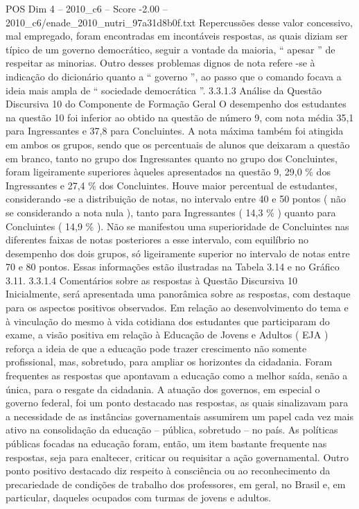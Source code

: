 \begin{textsample}{POS Dim 4 – 2010\_c6 – Score -2.00 – 2010\_c6/enade\_2010\_nutri\_97a31d8b0f.txt}
Repercussões desse valor concessivo, mal empregado, foram encontradas em incontáveis respostas, as quais diziam ser típico de um governo democrático, seguir a vontade da maioria, “ apesar ” de respeitar as minorias.
Outro desses problemas dignos de nota refere -se à indicação do dicionário quanto a “ governo ”, ao passo que o comando focava a ideia mais ampla de “ sociedade democrática ”. 3.3.1.3 Análise da Questão Discursiva 10 do Componente de Formação Geral O desempenho dos estudantes na questão 10 foi inferior ao obtido na questão de número 9, com nota média 35,1 para Ingressantes e 37,8 para Concluintes.
A nota máxima também foi atingida em ambos os grupos, sendo que os percentuais de alunos que deixaram a questão em branco, tanto no grupo dos Ingressantes quanto no grupo dos Concluintes, foram ligeiramente superiores àqueles apresentados na questão 9, 29,0 \% dos Ingressantes e 27,4 \% dos Concluintes.
Houve maior percentual de estudantes, considerando -se a distribuição de notas, no intervalo entre 40 e 50 pontos ( não se considerando a nota nula ), tanto para Ingressantes ( 14,3 \% ) quanto para Concluintes ( 14,9 \% ).
Não se manifestou uma superioridade de Concluintes nas diferentes faixas de notas posteriores a esse intervalo, com equilíbrio no desempenho dos dois grupos, só ligeiramente superior no intervalo de notas entre 70 e 80 pontos.
Essas informações estão ilustradas na Tabela 3.14 e no Gráfico 3.11. 3.3.1.4 Comentários sobre as respostas à Questão Discursiva 10 Inicialmente, será apresentada uma panorâmica sobre as respostas, com destaque para os aspectos positivos observados.
Em relação ao desenvolvimento do tema e à vinculação do mesmo à vida cotidiana dos estudantes que participaram do exame, a visão positiva em relação à Educação de Jovens e Adultos ( EJA ) reforça a ideia de que a educação pode trazer crescimento não somente profissional, mas, sobretudo, para ampliar os horizontes da cidadania.
Foram frequentes as respostas que apontavam a educação como a melhor saída, senão a única, para o resgate da cidadania.
A atuação dos governos, em especial o governo federal, foi um ponto destacado nas respostas, as quais sinalizavam para a necessidade de as instâncias governamentais assumirem um papel cada vez mais ativo na consolidação da educação – pública, sobretudo – no país.
As políticas públicas focadas na educação foram, então, um item bastante frequente nas respostas, seja para enaltecer, criticar ou requisitar a ação governamental.
Outro ponto positivo destacado diz respeito à consciência ou ao reconhecimento da precariedade de condições de trabalho dos professores, em geral, no Brasil e, em particular, daqueles ocupados com turmas de jovens e adultos.

\end{textsample}
